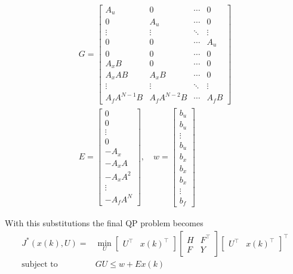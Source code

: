 \begin{gather*}
    G = \begin{bmatrix}
        A_u           & 0             & \cdots & 0      \\
        0             & A_u           & \cdots & 0      \\
        \vdots        & \vdots        & \ddots & \vdots \\
        0             & 0             & \cdots & A_u    \\
        0             & 0             & \cdots & 0      \\
        A_x B         & 0             & \cdots & 0      \\
        A_x AB        & A_x B         & \cdots & 0      \\
        \vdots        & \vdots        & \ddots & \vdots \\
        A_f A^{N-1} B & A_f A^{N-2} B & \cdots & A_f B
    \end{bmatrix}\\
    E = \begin{bmatrix}
        0        \\
        0        \\
        \vdots   \\
        0        \\
        -A_x     \\
        -A_x A   \\
        -A_x A^2 \\
        \vdots   \\
        -A_f A^N
    \end{bmatrix}, \quad
    w = \begin{bmatrix}
        b_u    \\
        b_u    \\
        \vdots \\
        b_u    \\
        b_x    \\
        b_x    \\
        b_x    \\
        \vdots \\
        b_f
    \end{bmatrix}
\end{gather*}

With this substitutions the final QP problem becomes
\begin{align*}
    J^*(x(k), U) =         & \min_{U}\begin{bmatrix}
                                         U^\top & {x(k)}^\top
                                     \end{bmatrix}
    \begin{bmatrix}
        H & F^\top \\
        F & Y
    \end{bmatrix}
    {\begin{bmatrix}
         U^\top & {x(k)}^\top
     \end{bmatrix}}^\top                                 \\
    \text{subject to}\quad & GU \leq w + Ex(k)
\end{align*}

